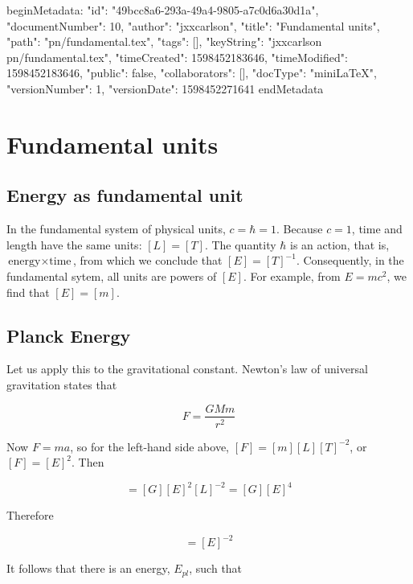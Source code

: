 beginMetadata:
{
    "id": "49bcc8a6-293a-49a4-9805-a7c0d6a30d1a",
    "documentNumber": 10,
    "author": "jxxcarlson",
    "title": "Fundamental units",
    "path": "pn/fundamental.tex",
    "tags": [],
    "keyString": "jxxcarlson pn/fundamental.tex",
    "timeCreated": 1598452183646,
    "timeModified": 1598452183646,
    "public": false,
    "collaborators": [],
    "docType": "miniLaTeX",
    "versionNumber": 1,
    "versionDate": 1598452271641
}
endMetadata

\section{Fundamental units}

\innertableofcontents

\subsection{Energy as fundamental unit}
In the fundamental system of  physical units, $c = \hbar = 1$. Because $c = 1$, time and length have the same units: $[L] = [T]$. The quantity $\hbar$ is
an action, that is, $\text{energy}\times \text{time}$, from which we conclude that $[E] = [T]^{-1}$.  Consequently, in the fundamental sytem, all units are powers of $[E]$.  For example, from $E = mc^2$, we find that $[E] = [m]$.
\medskip

\subsection{Planck Energy}

Let us apply this to the gravitational constant.  Newton's law of universal gravitation states that
\medskip

\begin{equation}
F = \frac{GMm}{r^2}
\end{equation}


Now $F  = ma$, so for the left-hand side above, $[F] = [m][L][T]^{-2}$, or $[F] = [E]^2$.  Then


\begin{equation}
[F] = [G][E]^2[L]^{-2} = [G][E]^4
\end{equation}


Therefore

\begin{equation}
[G] = [E]^{-2}
\end{equation}

It follows that there is an energy, $E_{pl}$, such that


